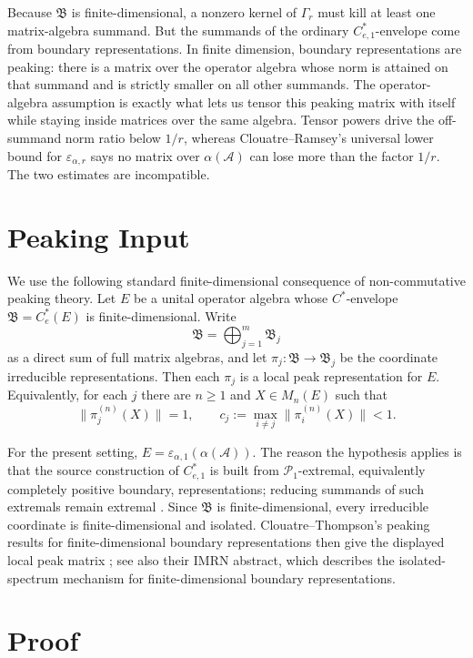 \documentclass[11pt]{article}
\newcommand{\A}{\mathcal A}
\newcommand{\B}{\mathfrak B}
\newcommand{\eps}{\varepsilon}
\begin{document}
Because \(\B\) is finite-dimensional, a nonzero kernel of \(\Gamma_r\) must kill
at least one matrix-algebra summand. But the summands of the ordinary
\(C^*_{e,1}\)-envelope come from boundary representations. In finite dimension,
boundary representations are peaking: there is a matrix over the operator
algebra whose norm is attained on that summand and is strictly smaller on all
other summands. The operator-algebra assumption is exactly what lets us tensor
this peaking matrix with itself while staying inside matrices over the same
algebra. Tensor powers drive the off-summand norm ratio below \(1/r\), whereas
Clouatre--Ramsey's universal lower bound for \(\eps_{\alpha,r}\) says no matrix
over \(\alpha(\A)\) can lose more than the factor \(1/r\). The two estimates
are incompatible.

\section*{Peaking Input}

We use the following standard finite-dimensional consequence of
non-commutative peaking theory. Let \(E\) be a unital operator algebra whose
\(C^*\)-envelope \(\B=C^*_e(E)\) is finite-dimensional. Write
\[
  \B=\bigoplus_{j=1}^m \B_j
\]
as a direct sum of full matrix algebras, and let
\(\pi_j:\B\to\B_j\) be the coordinate irreducible representations. Then each
\(\pi_j\) is a local peak representation for \(E\). Equivalently, for each
\(j\) there are \(n\geq 1\) and \(X\in M_n(E)\) such that
\[
  \|\pi_j^{(n)}(X)\|=1,
  \qquad
  c_j:=\max_{i\ne j}\|\pi_i^{(n)}(X)\|<1.
\]

For the present setting, \(E=\eps_{\alpha,1}(\alpha(\A))\). The reason the
hypothesis applies is that the source construction of \(C^*_{e,1}\) is built
from \(\mathcal P_1\)-extremal, equivalently completely positive boundary,
representations; reducing summands of such extremals remain extremal
\cite[Lemma 7.2]{CR}. Since \(\B\) is finite-dimensional, every irreducible
coordinate is finite-dimensional and isolated. Clouatre--Thompson's peaking
results for finite-dimensional boundary representations then give the displayed
local peak matrix \cite[Sections 3--4]{CT}; see also their IMRN abstract, which
describes the isolated-spectrum mechanism for finite-dimensional boundary
representations.

\section*{Proof}
\end{document}
